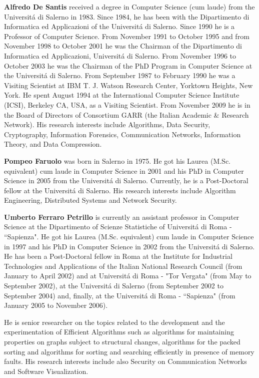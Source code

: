 \documentclass[authoryear]{elsarticle}
\begin{document}
\textbf{Alfredo De Santis} received a degree in Computer Science (cum laude) from the Universit\'{a} di Salerno in 1983. Since 1984, he has been with the Dipartimento di Informatica ed Applicazioni of the Universit\'{a} di Salerno. Since 1990 he is a Professor of Computer Science. From November 1991 to October 1995 and from November 1998 to October 2001 he was the Chairman of the Dipartimento di Informatica ed Applicazioni, Universit\'{a} di Salerno. From November 1996 to October 2003 he was the Chairman of the PhD Program in Computer Science at the Universit\'{a} di Salerno. From September 1987 to February 1990 he was a Visiting Scientist at IBM T. J. Watson Research Center, Yorktown Heights, New York. He spent August 1994 at the International Computer Science Institute (ICSI), Berkeley CA, USA, as a Visiting Scientist. From November 2009 he is in the Board of Directors of Consortium GARR (the Italian Academic \& Research Network). His research interests include Algorithms, Data Security, Cryptography, Information Forensics, Communication Networks, Information Theory, and Data Compression.

\medskip

\textbf{Pompeo Faruolo} was born in Salerno in 1975. He got his Laurea
(M.Sc. equivalent) cum laude in Computer Science in 2001 and his PhD
in Computer Science in 2005 from the Universit\'{a} di Salerno. Currently,
he is a Post-Doctoral fellow at the Universit\'{a} di Salerno. His
research interests include Algorithm Engineering, Distributed Systems
and Network Security.

\medskip

\textbf{Umberto Ferraro Petrillo} is currently an assistant professor
in Computer Science at the Dipartimento of Scienze
Statistiche of Universit\'{a} di Roma - ``Sapienza". He got his Laurea (M.Sc. equivalent) cum laude in
Computer Science in 1997 and his PhD in Computer Science in 2002 from
the Universit\'{a} di Salerno. He has been a Post-Doctoral fellow in Roma
at the Institute for Industrial Technologies and Applications of the
Italian National Research Council (from January to April 2002) and at
Universit\'{a} di Roma - "Tor Vergata" (from May to September 2002), at the
Universit\'{a} di Salerno (from September 2002 to September 2004) and, finally, at
the Universit\'{a} di Roma - ``Sapienza" (from January 2005 to November 2006).

He is senior researcher on the topics related to the development and
the experimentation of Efficient Algorithms such as algorithms for
maintaining properties on graphs subject to structural changes,
algorithms for the packed sorting and algorithms for sorting and
searching efficiently in presence of memory faults.  His research
interests include also Security on Communication Networks and Software
Visualization.
\end{document}
